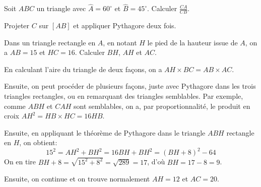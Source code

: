 \begin{exo}
Soit $ABC$ un triangle avec $\widehat{A}=60^\circ$ et $\widehat{B}=45^\circ$. 
Calculer $\frac{CA}{CB}$.
\begin{center}
\end{center}
\begin{sol}
Projeter $C$ sur $[AB]$ et appliquer Pythagore deux fois.
\end{sol}
\end{exo}




\begin{exo}
Dans un triangle rectangle en $A$, en notant $H$ le pied de la hauteur issue de $A$, on a $AB=15$ et $HC=16$.
Calculer $BH$, $AH$ et $AC$.
\begin{center}
\end{center}
\begin{sol}
En calculant l'aire du triangle de deux façons, on a $AH\times BC = AB\times AC$.

Ensuite, on peut procéder de plusieurs façons, juste avec Pythagore dans les trois triangles rectangles, ou en remarquant des triangles semblables.
Par exemple, comme $ABH$ et $CAH$ sont semblables, on a, par proportionnalité, le produit en croix $AH^2=HB\times HC = 16 HB$.

Ensuite, en appliquant le théorème de Pythagore dans le triangle $ABH$ rectangle en $H$, on obtient:
\[ 15^2 = AH^2+BH^2 = 16BH+BH^2 = (BH+8)^2-64\]
On en tire $BH+8=\sqrt{15^2+8^2}=\sqrt{289}=17$, d'où $BH=17-8=9$.

Ensuite, on continue et on trouve normalement $AH=12$ et $AC=20$.
\end{sol}
\end{exo}






